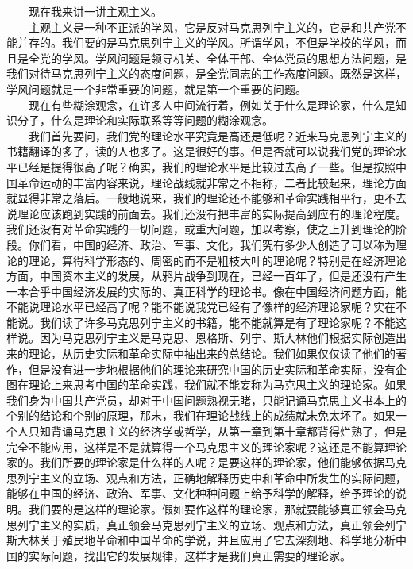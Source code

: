 \documentclass[cn,11pt,chinese]{elegantbook}
\begin{document}
　　现在我来讲一讲主观主义。\\
　　主观主义是一种不正派的学风，它是反对马克思列宁主义的，它是和共产党不能并存的。我们要的是马克思列宁主义的学风。所谓学风，不但是学校的学风，而且是全党的学风。学风问题是领导机关、全体干部、全体党员的思想方法问题，是我们对待马克思列宁主义的态度问题，是全党同志的工作态度问题。既然是这样，学风问题就是一个非常重要的问题，就是第一个重要的问题。\\
　　现在有些糊涂观念，在许多人中间流行着，例如关于什么是理论家，什么是知识分子，什么是理论和实际联系等等问题的糊涂观念。\\
　　我们首先要问，我们党的理论水平究竟是高还是低呢？近来马克思列宁主义的书籍翻译的多了，读的人也多了。这是很好的事。但是否就可以说我们党的理论水平已经是提得很高了呢？确实，我们的理论水平是比较过去高了一些。但是按照中国革命运动的丰富内容来说，理论战线就非常之不相称，二者比较起来，理论方面就显得非常之落后。一般地说来，我们的理论还不能够和革命实践相平行，更不去说理论应该跑到实践的前面去。我们还没有把丰富的实际提高到应有的理论程度。我们还没有对革命实践的一切问题，或重大问题，加以考察，使之上升到理论的阶段。你们看，中国的经济、政治、军事、文化，我们究有多少人创造了可以称为理论的理论，算得科学形态的、周密的而不是粗枝大叶的理论呢？特别是在经济理论方面，中国资本主义的发展，从鸦片战争到现在，已经一百年了，但是还没有产生一本合乎中国经济发展的实际的、真正科学的理论书。像在中国经济问题方面，能不能说理论水平已经高了呢？能不能说我党已经有了像样的经济理论家呢？实在不能说。我们读了许多马克思列宁主义的书籍，能不能就算是有了理论家呢？不能这样说。因为马克思列宁主义是马克思、恩格斯、列宁、斯大林他们根据实际创造出来的理论，从历史实际和革命实际中抽出来的总结论。我们如果仅仅读了他们的著作，但是没有进一步地根据他们的理论来研究中国的历史实际和革命实际，没有企图在理论上来思考中国的革命实践，我们就不能妄称为马克思主义的理论家。如果我们身为中国共产党员，却对于中国问题熟视无睹，只能记诵马克思主义书本上的个别的结论和个别的原理，那末，我们在理论战线上的成绩就未免太坏了。如果一个人只知背诵马克思主义的经济学或哲学，从第一章到第十章都背得烂熟了，但是完全不能应用，这样是不是就算得一个马克思主义的理论家呢？这还是不能算理论家的。我们所要的理论家是什么样的人呢？是要这样的理论家，他们能够依据马克思列宁主义的立场、观点和方法，正确地解释历史中和革命中所发生的实际问题，能够在中国的经济、政治、军事、文化种种问题上给予科学的解释，给予理论的说明。我们要的是这样的理论家。假如要作这样的理论家，那就要能够真正领会马克思列宁主义的实质，真正领会马克思列宁主义的立场、观点和方法，真正领会列宁斯大林关于殖民地革命和中国革命的学说，并且应用了它去深刻地、科学地分析中国的实际问题，找出它的发展规律，这样才是我们真正需要的理论家。\\
\end{document}
